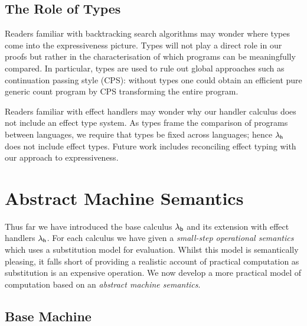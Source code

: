 \documentclass[12pt,phd,lfcs,twoside,openright,logo,leftchapter,normalheadings]{infthesis}
\theoremstyle{plain}
\theoremstyle{definition}
\begin{document}
\subsection{The Role of Types}

Readers familiar with backtracking search algorithms may wonder where
types come into the expressiveness picture.
%
Types will not play a direct role in our proofs but rather in the
characterisation of which programs can be meaningfully compared. In
particular, types are used to rule out global approaches such as
continuation passing style (CPS): without types one could obtain an
efficient pure generic count program by CPS transforming the entire
program.

Readers familiar with effect handlers may wonder why our handler
calculus does not include an effect type system.
%
As types frame the comparison of programs between languages, we
require that types be fixed across languages; hence $\lambda_{\mathsf{h}}$ does not
include effect types.
%
Future work includes reconciling effect typing with our approach to
expressiveness.

\section{Abstract Machine Semantics}
\label{sec:abstract-machine-semantics}
Thus far we have introduced the base calculus $\lambda_{\mathsf{b}}$ and its
extension with effect handlers $\lambda_{\mathsf{h}}$.
%
For each calculus we have given a \emph{small-step operational
  semantics} which uses a substitution model for evaluation. Whilst
this model is semantically pleasing, it falls short of providing a
realistic account of practical computation as substitution is an
expensive operation. We now develop a more practical model of
computation based on an \emph{abstract machine semantics}.

\subsection{Base Machine}
\label{sec:base-abstract-machine}

\newcommand{\Conf}{\dec{Conf}}
\newcommand{\EConf}{\dec{EConf}}
\newcommand{\MVal}{\dec{MVal}}
\end{document}
